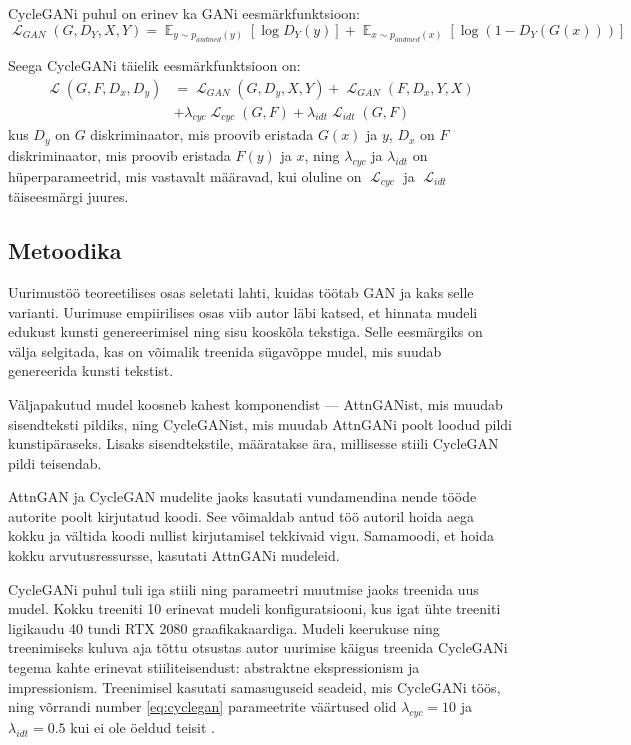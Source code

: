 \documentclass{vilgym}
\DeclareMathOperator{\EX}{\mathbb{E}}
\DeclareMathOperator{\loss}{\mathcal{L}}
\begin{document}
	CycleGANi puhul on erinev ka GANi eesmärkfunktsioon:
	\begin{equation}
		\loss_{GAN}(G,D_Y, X, Y) = \EX_{y\sim p_{andmed}(y)}[\log D_Y(y)] + \EX_{x\sim p_{andmed}(x)}[\log(1-D_Y(G(x)))]
	\end{equation}
	
	Seega CycleGANi täielik eesmärkfunktsioon on:
	\begin{equation} \label{eq:cyclegan}
		\begin{aligned}
			\loss(G, F, D_x, D_y) &= \loss_{GAN}(G, D_y, X, Y) + \loss_{GAN}(F, D_x, Y, X) \\
								  &+ \lambda_{cyc} \loss_{cyc}(G, F) + \lambda_{idt} \loss_{idt}(G, F)
		\end{aligned}
	\end{equation}
	kus $ D_y $ on $ G $ diskriminaator, mis proovib eristada $ G(x) $ ja $ y $, $ D_x $ on  $ F $ diskriminaator, mis proovib eristada $ F(y) $ ja $ x $, ning $ \lambda_{cyc} $ ja $ \lambda_{idt} $ on hüperparameetrid, mis vastavalt määravad, kui oluline on $ \loss_{cyc} $ ja $ \loss_{idt} $ täiseesmärgi juures. \parencite{cyclegan}

	\subsection{Metoodika}
	Uurimustöö teoreetilises osas seletati lahti, kuidas töötab GAN ja kaks selle varianti. Uurimuse empiirilises osas viib autor läbi katsed, et hinnata mudeli edukust kunsti genereerimisel ning sisu kooskõla tekstiga. Selle eesmärgiks on välja selgitada, kas on võimalik treenida sügavõppe mudel, mis suudab genereerida kunsti tekstist.

	Väljapakutud mudel koosneb kahest komponendist --- AttnGANist, mis muudab sisendteksti pildiks, ning CycleGANist, mis muudab AttnGANi poolt loodud pildi kunstipäraseks. Lisaks sisendtekstile, määratakse ära, millisesse stiili CycleGAN pildi teisendab.

	AttnGAN ja CycleGAN mudelite jaoks kasutati vundamendina nende tööde autorite poolt kirjutatud koodi. See võimaldab antud töö autoril hoida aega kokku ja vältida koodi nullist kirjutamisel tekkivaid vigu. Samamoodi, et hoida kokku arvutusressursse, kasutati AttnGANi mudeleid.
	
	CycleGANi puhul tuli iga stiili ning parameetri muutmise jaoks treenida uus mudel. Kokku treeniti 10 erinevat mudeli konfiguratsiooni, kus igat ühte treeniti ligikaudu 40 tundi RTX 2080 graafikakaardiga. Mudeli keerukuse ning treenimiseks kuluva aja tõttu otsustas autor uurimise käigus treenida CycleGANi tegema kahte erinevat stiiliteisendust: abstraktne ekspressionism ja impressionism. Treenimisel kasutati samasuguseid seadeid, mis CycleGANi töös, ning võrrandi number \ref{eq:cyclegan} parameetrite väärtused olid $ \lambda_{cyc} = 10 $ ja $ \lambda_{idt} = 0.5 $ kui ei ole öeldud teisit \parencite{cyclegan}.
\end{document}
